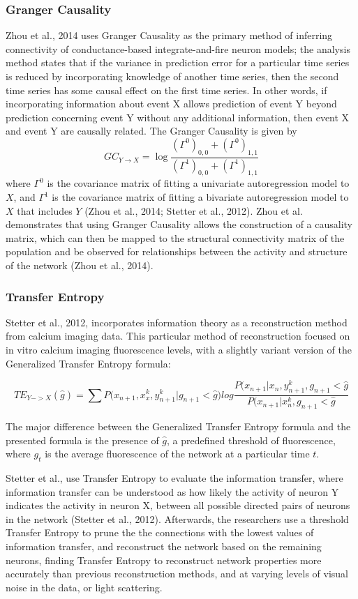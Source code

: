 \documentclass[11pt,titlepage]{article}
\begin{document}
\subsubsection{Granger Causality}
Zhou et al., 2014 uses Granger Causality as the primary method of inferring connectivity of conductance-based integrate-and-fire neuron models; the analysis method states that if the variance in prediction error for a particular time series is reduced by incorporating knowledge of another time series, then the second time series has some causal effect on the first time series. In other words, if incorporating information about event X allows prediction of event Y beyond prediction concerning event Y without any additional information, then event X and event Y are causally related. The Granger Causality is given by 
$$ GC_{Y \rightarrow X} = \log\frac{(\Gamma^0)_{0,0} + (\Gamma^0)_{1,1}}{(\Gamma^1)_{0,0} + (\Gamma^1)_{1,1}}$$
where $\Gamma^0$ is the covariance matrix of fitting a univariate autoregression model to $X$, and $\Gamma^1$ is the covariance matrix of fitting a bivariate autoregression model to $X$ that includes $Y$ (Zhou et al., 2014; Stetter et al., 2012). Zhou et al. demonstrates that using Granger Causality allows the construction of a causality matrix, which can then be mapped to the structural connectivity matrix of the population and be observed for relationships between the activity and structure of the network (Zhou et al., 2014).\par

\subsubsection{Transfer Entropy}
Stetter et al., 2012, incorporates information theory as a reconstruction method from calcium imaging data. This particular method of reconstruction focused on in vitro calcium imaging fluorescence levels, with a slightly variant version of the Generalized Transfer Entropy formula:

$$TE_{Y->X}(\hat{g}) = \sum{P(x_{n+1}, x_x^k,y_{n+1}^k|g_{n+1}<\hat{g}}) log \frac{P(x_{n+1}|x_n,y_{n+1}^k,g_{n+1}<\hat{g}}{P(x_{n+1}|x_n^k,g_{n+1}<\hat{g}}$$

The major difference between the Generalized Transfer Entropy formula and the presented formula is the presence of $\hat{g}$, a predefined threshold of fluorescence, where $g_t$ is the average fluorescence of the network at a particular time $t$.\par

Stetter et al., use Transfer Entropy to evaluate the information transfer, where information transfer can be understood as how likely the activity of neuron Y indicates the activity in neuron X, between all possible directed pairs of neurons in the network (Stetter et al., 2012). Afterwards, the researchers use a threshold Transfer Entropy to prune the the connections with the lowest values of information transfer, and reconstruct the network based on the remaining neurons, finding Transfer Entropy to reconstruct network properties more accurately than previous reconstruction methods, and at varying levels of visual noise in the data, or light scattering.\par
\end{document}
